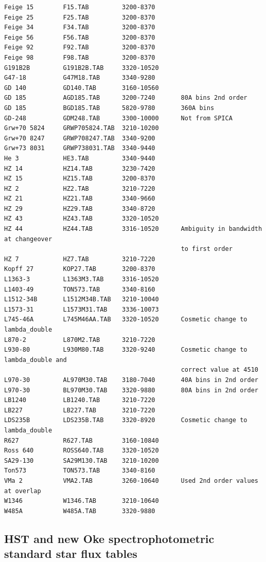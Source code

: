 \documentclass[11pt,twoside]{article}
\begin{document}
\begin{verbatim}
Feige 15        F15.TAB         3200-8370
Feige 25        F25.TAB         3200-8370
Feige 34        F34.TAB         3200-8370
Feige 56        F56.TAB         3200-8370
Feige 92        F92.TAB         3200-8370
Feige 98        F98.TAB         3200-8370
G191B2B         G191B2B.TAB     3320-10520
G47-18          G47M18.TAB      3340-9280
GD 140          GD140.TAB       3160-10560
GD 185          AGD185.TAB      3200-7240       80A bins 2nd order
GD 185          BGD185.TAB      5820-9780       360A bins
GD-248          GDM248.TAB      3300-10000      Not from SPICA
Grw+70 5824     GRWP705824.TAB  3210-10200
Grw+70 8247     GRWP708247.TAB  3340-9200
Grw+73 8031     GRWP738031.TAB  3340-9440
He 3            HE3.TAB         3340-9440
HZ 14           HZ14.TAB        3230-7420
HZ 15           HZ15.TAB        3200-8370
HZ 2            HZ2.TAB         3210-7220
HZ 21           HZ21.TAB        3340-9660
HZ 29           HZ29.TAB        3340-8720
HZ 43           HZ43.TAB        3320-10520
HZ 44           HZ44.TAB        3316-10520      Ambiguity in bandwidth at changeover
                                                to first order
HZ 7            HZ7.TAB         3210-7220
Kopff 27        KOP27.TAB       3200-8370
L1363-3         L1363M3.TAB     3316-10520
L1403-49        TON573.TAB      3340-8160
L1512-34B       L1512M34B.TAB   3210-10040
L1573-31        L1573M31.TAB    3336-10073
L745-46A        L745M46AA.TAB   3320-10520      Cosmetic change to lambda_double
L870-2          L870M2.TAB      3210-7220
L930-80         L930M80.TAB     3320-9240       Cosmetic change to lambda_double and
                                                correct value at 4510
L970-30         AL970M30.TAB    3180-7040       40A bins in 2nd order
L970-30         BL970M30.TAB    3320-9880       80A bins in 2nd order
LB1240          LB1240.TAB      3210-7220
LB227           LB227.TAB       3210-7220
LDS235B         LDS235B.TAB     3320-8920       Cosmetic change to lambda_double
R627            R627.TAB        3160-10840
Ross 640        ROSS640.TAB     3320-10520
SA29-130        SA29M130.TAB    3210-10200
Ton573          TON573.TAB      3340-8160
VMa 2           VMA2.TAB        3260-10640      Used 2nd order values at overlap
W1346           W1346.TAB       3210-10640
W485A           W485A.TAB       3320-9880
\end{verbatim}\normalsize


\subsection{\label{standard2}HST and new Oke spectrophotometric standard star flux tables}
\end{document}
